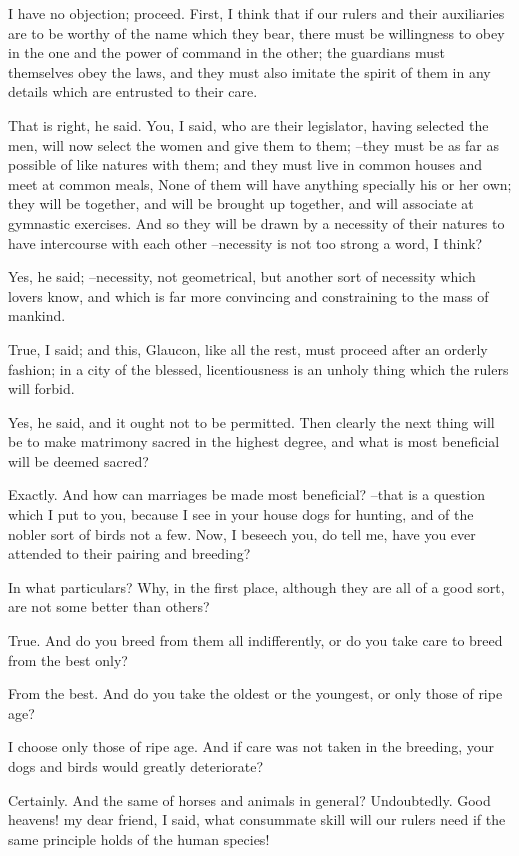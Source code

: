I have no objection; proceed.
First, I think that if our rulers and their auxiliaries are to be worthy of the name which they bear, there must be willingness to obey in the one and the power of command in the other; the guardians must themselves obey the laws, and they must also imitate the spirit of them in any details which are entrusted to their care.

That is right, he said.
You, I said, who are their legislator, having selected the men, will now select the women and give them to them; --they must be as far as possible of like natures with them; and they must live in common houses and meet at common meals, None of them will have anything specially his or her own; they will be together, and will be brought up together, and will associate at gymnastic exercises. And so they will be drawn by a necessity of their natures to have intercourse with each other --necessity is not too strong a word, I think?

Yes, he said; --necessity, not geometrical, but another sort of necessity which lovers know, and which is far more convincing and constraining to the mass of mankind.

True, I said; and this, Glaucon, like all the rest, must proceed after an orderly fashion; in a city of the blessed, licentiousness is an unholy thing which the rulers will forbid.

Yes, he said, and it ought not to be permitted.
Then clearly the next thing will be to make matrimony sacred in the highest degree, and what is most beneficial will be deemed sacred?

Exactly.
And how can marriages be made most beneficial? --that is a question which I put to you, because I see in your house dogs for hunting, and of the nobler sort of birds not a few. Now, I beseech you, do tell me, have you ever attended to their pairing and breeding?

In what particulars?
Why, in the first place, although they are all of a good sort, are not some better than others?

True.
And do you breed from them all indifferently, or do you take care to breed from the best only?

From the best.
And do you take the oldest or the youngest, or only those of ripe age?

I choose only those of ripe age.
And if care was not taken in the breeding, your dogs and birds would greatly deteriorate?

Certainly.
And the same of horses and animals in general?
Undoubtedly.
Good heavens! my dear friend, I said, what consummate skill will our rulers need if the same principle holds of the human species!

